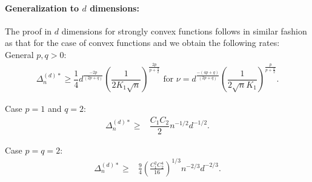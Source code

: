\paragraph{Generalization to $d$ dimensions:}
The proof in $d$ dimensions for strongly convex functions follows in similar fashion as that for the case of convex functions and we obtain the following rates:\\
General $p, q >0$:
\begin{align}
\Delta_n^{(d)*} \ge \dfrac{1}{4} d^{\frac{-2p}{(2p+q)}} \left(\dfrac{1}{2 K_1 \sqrt n}\right)^{\frac{2p}{p+\frac{q}{2}}} \text{ for } 
\nu = d^{\frac{-(4p+q)}{(2p+q)}}\left(\dfrac{1}{2\sqrt{n} K_1} \right)^{\frac{p}{p+\frac{q}{2}}}.
\label{eq:lb-pq-d}
\end{align}

Case $p=1$ and $q=2$:
\begin{align*}
\Delta_n^{(d)*}  \ge& \dfrac{C_1 C_2}{2} n^{-1/2} d^{-1/2}.
\end{align*}

Case $p=q=2$:
\begin{align*}
\Delta_n^{(d)*}  \ge& \frac{9}{4}\left(\frac{C_1^2 C_2^4}{16}\right)^{1/3} n^{-2/3} d^{-2/3}.
\end{align*}
